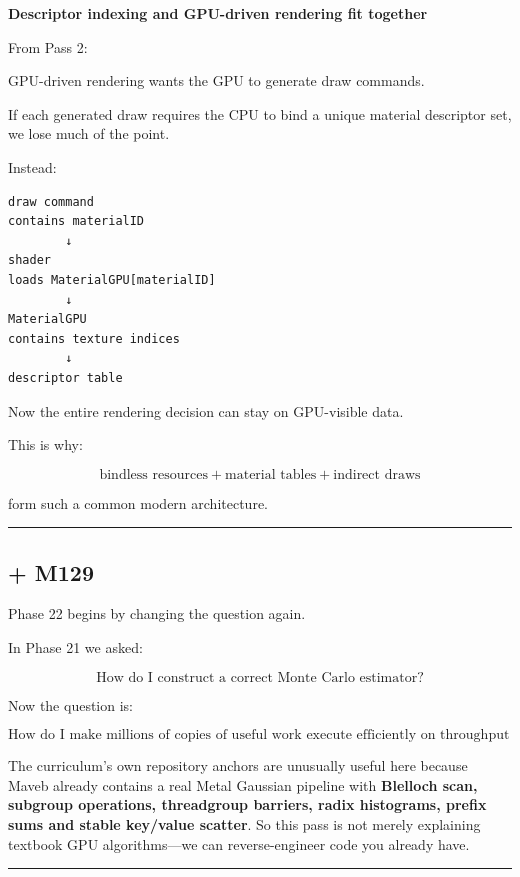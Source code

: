 \textbf{Descriptor indexing and GPU-driven rendering fit together}

From Pass 2:

GPU-driven rendering wants the GPU to generate draw commands.

If each generated draw requires the CPU to bind a unique material descriptor set, we lose much of the point.

Instead:

\begin{verbatim}
draw command
contains materialID
        ↓
shader
loads MaterialGPU[materialID]
        ↓
MaterialGPU
contains texture indices
        ↓
descriptor table
\end{verbatim}

Now the entire rendering decision can stay on GPU-visible data.

This is why:

\[
\boxed{
\text{bindless resources}
+
\text{material tables}
+
\text{indirect draws}
}
\]

form such a common modern architecture.

\begin{center}\rule{0.5\linewidth}{0.5pt}\end{center}

\subsection{+ M129}\label{01-foundations-i-ch008-m129}

Phase 22 begins by changing the question again.

In Phase 21 we asked:

\[
\boxed{\text{How do I construct a correct Monte Carlo estimator?}}
\]

Now the question is:

\[
\boxed{\text{How do I make millions of copies of useful work execute efficiently on throughput hardware?}}
\]

The curriculum's own repository anchors are unusually useful here because Maveb already contains a real Metal Gaussian pipeline with \textbf{Blelloch scan, subgroup operations, threadgroup barriers, radix histograms, prefix sums and stable key/value scatter}. So this pass is not merely explaining textbook GPU algorithms---we can reverse-engineer code you already have.

\begin{center}\rule{0.5\linewidth}{0.5pt}\end{center}

